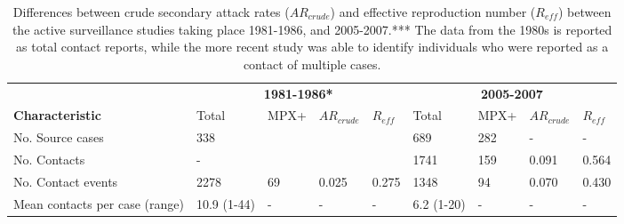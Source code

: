 \begin{table} %
\centering %
\caption{Differences between crude secondary attack rates ($AR_{crude}$) and effective reproduction number ($R_{eff}$) between the active surveillance studies taking place 1981-1986, and 2005-2007.*** The data from the 1980s is reported as total contact reports, while the more recent study was able to identify individuals who were reported as a contact of multiple cases.} %
\begin{tabular}{p{4cm}p{1.1cm}p{1cm}p{1cm}p{1.1cm}p{1.1cm}p{1cm}p{1cm}p{1.1cm}} %
\toprule %
& \multicolumn{4}{c}{\textbf{1981-1986*}} & \multicolumn{4}{c}{\textbf{2005-2007}}\\ %
\cmidrule(l){2-5} \cmidrule(l){6-9} %

\textbf{Characteristic} & Total & MPX+ & $AR_{crude}$ & $R_{eff}$ & Total & MPX+ & $AR_{crude}$ & $R_{eff}$ \\ %
\midrule %
No. Source cases & 338 & & & & 689 & 282 & - & - \\ %
No. Contacts & - & & & & 1741 & 159 & 0.091 & 0.564 \\ %
No. Contact events & 2278 & 69 & 0.025 & 0.275 & 1348 & 94 & 0.070 & 0.430 \\ [0.1cm]
Mean contacts per case (range) & 10.9 (1-44) & - & - & - & 6.2 (1-20) & - & - & - \\ 
\bottomrule %
\end{tabular}
\end{table}

